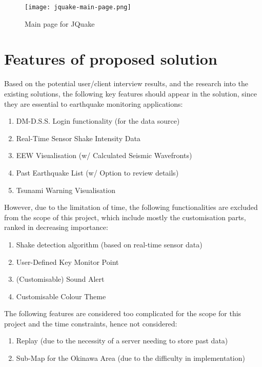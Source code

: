 \begin{figure}[htp]
    \centering

    \texttt{[image: jquake-main-page.png]}
    \caption{Main page for JQuake}
    \label{fig:jquake-main-page}
\end{figure}

\section{Features of proposed solution}

Based on the potential user/client interview results, and the research into the existing solutions, the following key features should appear in the solution, since they are essential to earthquake monitoring applications:
\begin{enumerate}
    \item DM-D.S.S. Login functionality (for the data source)
    \item Real-Time Sensor Shake Intensity Data
    \item EEW Visualisation (w/ Calculated Seismic Wavefronts)
    \item Past Earthquake List (w/ Option to review details)
    \item Tsunami Warning Visualisation
\end{enumerate}

However, due to the limitation of time, the following functionalities are excluded from the scope of this project, which include mostly the customisation parts, ranked in decreasing importance:
\begin{enumerate}
    \item Shake detection algorithm (based on real-time sensor data)
    \item User-Defined Key Monitor Point
    \item (Customisable) Sound Alert
    \item Customisable Colour Theme
\end{enumerate}

The following features are considered too complicated for the scope for this project and the time constraints, hence not considered:
\begin{enumerate}
    \item Replay (due to the necessity of a server needing to store past data)
    \item Sub-Map for the Okinawa Area (due to the difficulty in implementation)
\end{enumerate}

